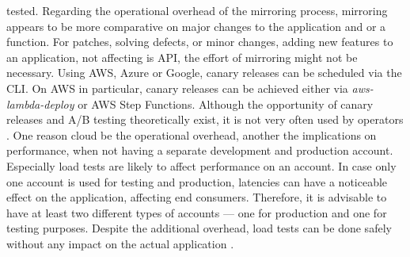 \documentclass[a4paper,twoside,11pt, pagesize]{scrartcl}
\begin{document}
tested. Regarding the operational overhead of the mirroring process, mirroring appears to be more comparative on major changes to the application and or a function. For patches, solving defects, or minor changes, adding new features to an application, not affecting is API, the effort of mirroring might not be necessary. Using AWS, Azure or Google, canary releases can be scheduled via the CLI. On AWS in particular, canary releases can be achieved either via \textit{aws-lambda-deploy} or AWS Step Functions. Although the opportunity of canary releases and A/B testing theoretically exist, it is not very often used by operators \cite{leitner2019mixed}. One reason cloud be the operational overhead, another the implications on performance, when not having a separate development and production account. Especially load tests are likely to affect performance on an account. In case only one account is used for testing and production, latencies can have a noticeable effect on the application, affecting end consumers. Therefore, it is advisable to have at least two different types of accounts — one for production and one for testing purposes. Despite the additional overhead, load tests can be done safely without any impact on the actual application \cite{leitner2019mixed}.
\end{document}
